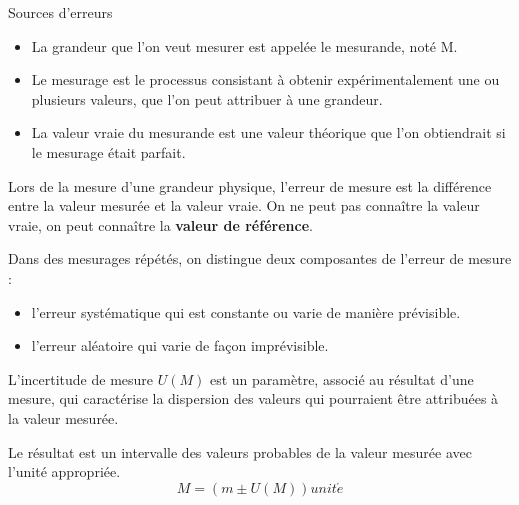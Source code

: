 \documentclass[24pt]{article}
\begin{document}
\begin{concept}{Sources d'erreurs}
    \begin{itemize}
        \item La grandeur que l'on veut mesurer est appelée le mesurande, noté M.
        \item Le mesurage est le processus consistant à obtenir expérimentalement une
              ou plusieurs valeurs, que l'on peut attribuer à une grandeur.
        \item La valeur vraie du mesurande est une valeur théorique que l'on
              obtiendrait si le mesurage était parfait.
    \end{itemize}

    Lors de la mesure d'une grandeur physique,
    l'erreur de mesure est la différence entre la
    valeur mesurée et la valeur vraie.
    On ne peut pas connaître la valeur vraie, on peut connaître la
    \textbf{valeur de référence}.

    Dans des mesurages répétés, on distingue deux composantes de l'erreur de mesure :
    \begin{itemize}
        \item l'erreur systématique qui est constante ou varie de manière prévisible.
        \item l'erreur aléatoire qui varie de façon imprévisible.
    \end{itemize}
    L'incertitude de mesure $U(M)$ est un paramètre, associé au résultat d'une mesure, qui
    caractérise la dispersion des valeurs qui pourraient être attribuées à la valeur mesurée.

    Le résultat est un intervalle des valeurs probables de la valeur mesurée avec l'unité appropriée.
    $$M =( m±U(M) ) unit\acute{e}$$

\end{concept}
\end{document}
